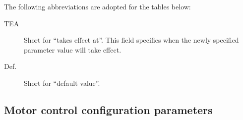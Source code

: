 \documentclass{zubaxdoc}
\newcommand{\CfgDef}[1]{%
    \StrSubstitute{#1}{+}{\textunderscore}[\temp]%
    \texttt{\temp}\label{#1}%
}
\newcounter{CfgReferenceScratchpad}
\newcommand{\CfgListReferences}[1]{%
    \renewcommand*{\do}[1]{%
        \ifnum\theCfgReferenceScratchpad=0%
            \stepcounter{CfgReferenceScratchpad}%
            \else{,\ }%
        \fi%
        \hyperlink{page.##1}{##1}%
    }%
    \dolistcsloop{#1}%
    \setcounter{CfgReferenceScratchpad}{0}%
}
\begin{document}
The following abbreviations are adopted for the tables below:
\begin{description}
\item[TEA] Short for ``takes effect at''. This field specifies when the newly specified parameter value will
take effect.
\item[Def.] Short for ``default value''.
\end{description}

\newcommand\CfgParamIndexEntry[7]{%
    \CfgDef{#1} & \footnotesize{#2} & \footnotesize{\CfgListReferences{#1}} & \footnotesize{#3} &
    \footnotesize{#4} & \footnotesize{#5} & \footnotesize{#6} &
    \footnotesize{#7} \tabularnewline
}%

\newenvironment{CfgParamIndex}[1]{%
    \begin{ZubaxTableWrapper}{#1}
    \setlength\tabcolsep{2.5pt}
    \begin{ZubaxWrappedTable}{@{} l l l l | c c c | X @{}}
    Name & Unit & Pages & TEA & Min & Max & Def. & Description \\
}{%
    \end{ZubaxWrappedTable}
    \end{ZubaxTableWrapper}
}

\subsection{Motor control configuration parameters}
\end{document}

